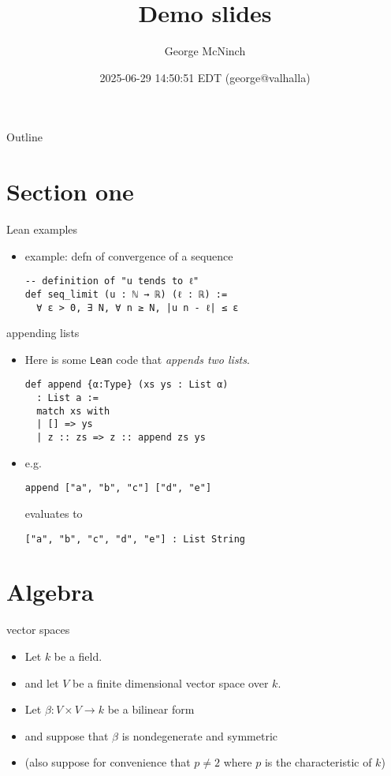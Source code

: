 \documentclass[svgnames]{beamer}
\author{George McNinch}
\date{2025-06-29 14:50:51 EDT (george@valhalla)}
\title{Demo slides}
\begin{document}
\maketitle
\begin{frame}{Outline}
\tableofcontents
\end{frame}

\section{Section one}
\label{sec:one}
\begin{frame}[label={sec:examples},fragile]{Lean examples}
 \begin{itemize}[<+->]
\item example: defn of convergence of a sequence

\begin{verbatim}
-- definition of "u tends to ℓ" 
def seq_limit (u : ℕ → ℝ) (ℓ : ℝ) :=
  ∀ ε > 0, ∃ N, ∀ n ≥ N, |u n - ℓ| ≤ ε
\end{verbatim}
\end{itemize}
\end{frame}
\begin{frame}[label={sec:appending-lists},fragile]{appending lists}
 \begin{itemize}[<+->]
\item Here is some \texttt{Lean} code that \emph{appends two lists}.
\begin{verbatim}
def append {α:Type} (xs ys : List α)
  : List a :=
  match xs with
  | [] => ys
  | z :: zs => z :: append zs ys
\end{verbatim}

\item e.g.
\begin{verbatim}
append ["a", "b", "c"] ["d", "e"]
\end{verbatim}
evaluates to
\begin{verbatim}
["a", "b", "c", "d", "e"] : List String
\end{verbatim}
\end{itemize}
\end{frame}
\section{Algebra}
\label{sec:"finite-algebra"}
\begin{frame}[label={sec:vector-spaces}]{vector spaces}
\begin{itemize}[<+->]
\item Let \(k\) be a \alert{field}.

\item and let \(V\) be a finite dimensional vector space over \(k\).

\item Let \(\beta:V \times V \to k\) be a \alert{bilinear form}

\item and suppose that \(\beta\) is \alert{nondegenerate} and \alert{symmetric}

\item (also suppose for convenience that \(p\neq 2\) where \(p\) is the characteristic of \(k\))
\end{itemize}
\end{frame}
\end{document}
